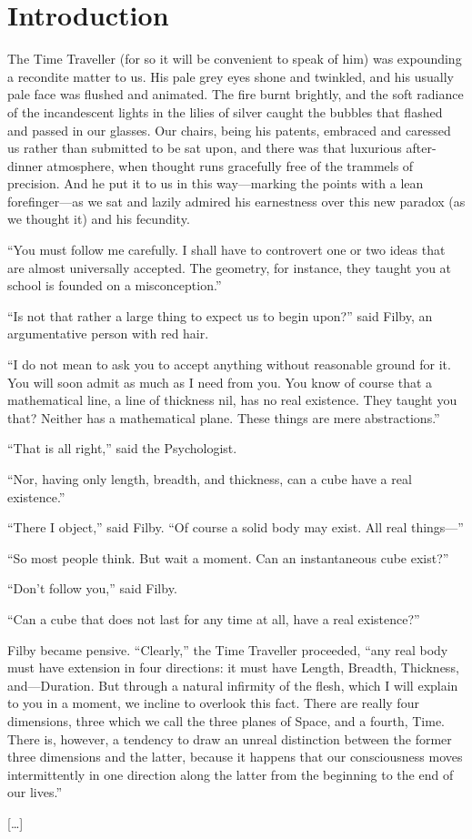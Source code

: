 \documentclass[../book]{subfiles}
\begin{document}
\chapter*{Introduction}


The Time Traveller (for so it will be convenient to speak of him) was expounding a recondite matter to us. His pale grey eyes shone and twinkled, and his usually pale face was flushed and animated. The fire burnt brightly, and the soft radiance of the incandescent lights in the lilies of silver caught the bubbles that flashed and passed in our glasses. Our chairs, being his patents, embraced and caressed us rather than submitted to be sat upon, and there was that luxurious after-dinner atmosphere, when thought runs gracefully free of the trammels of precision. And he put it to us in this way—marking the points with a lean forefinger—as we sat and lazily admired his earnestness over this new paradox (as we thought it) and his fecundity.

“You must follow me carefully. I shall have to controvert one or two ideas that are almost universally accepted. The geometry, for instance, they taught you at school is founded on a misconception.”

“Is not that rather a large thing to expect us to begin upon?” said Filby, an argumentative person with red hair.

“I do not mean to ask you to accept anything without reasonable ground for it. You will soon admit as much as I need from you. You know of course that a mathematical line, a line of thickness nil, has no real existence. They taught you that? Neither has a mathematical plane. These things are mere abstractions.”

“That is all right,” said the Psychologist.

“Nor, having only length, breadth, and thickness, can a cube have a real existence.”

“There I object,” said Filby. “Of course a solid body may exist. All real things—”

“So most people think. But wait a moment. Can an instantaneous cube exist?”

“Don’t follow you,” said Filby.

“Can a cube that does not last for any time at all, have a real existence?”

Filby became pensive. “Clearly,” the Time Traveller proceeded, “any real body must have extension in four directions: it must have Length, Breadth, Thickness, and—Duration. But through a natural infirmity of the flesh, which I will explain to you in a moment, we incline to overlook this fact. There are really four dimensions, three which we call the three planes of Space, and a fourth, Time. There is, however, a tendency to draw an unreal distinction between the former three dimensions and the latter, because it happens that our consciousness moves intermittently in one direction along the latter from the beginning to the end of our lives.”

[…]
\end{document}
